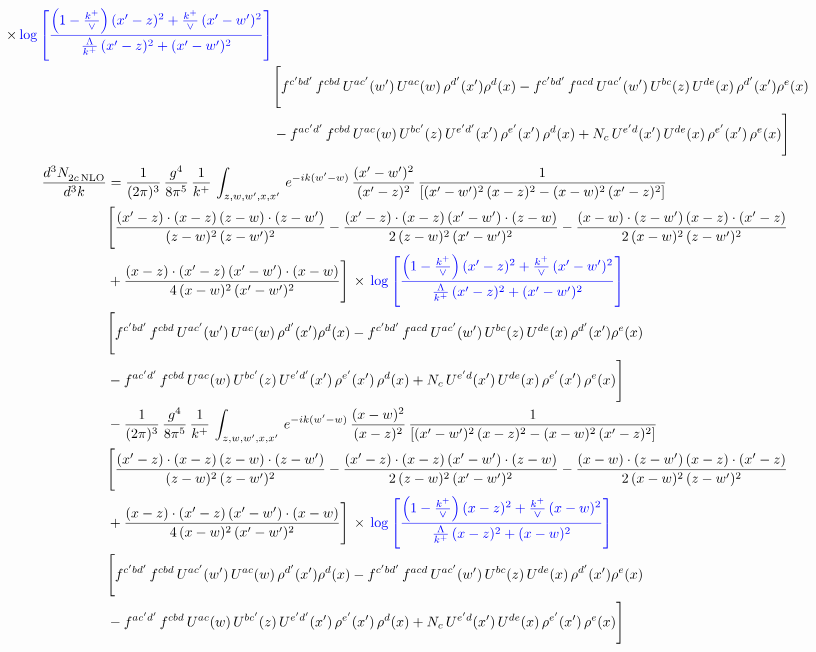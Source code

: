 \documentclass[9pt]{article}
\newcommand{\new}[1]{{\color{blue}#1}}
\numberwithin{equation}{section}
\begin{document}
\begin{align}
\times\,\new{\log{\left[\frac{\left(1-\frac{k^{+}}{\vee}\right)(x'-z)^{2}+\frac{k^{+}}{\vee}\,(x'-w')^{2}}{\frac{\Lambda}{k^{+}}\,(x'-z)^{2}+(x'-w')^{2}}\right]}} \notag \\ & \Bigg[f^{c'bd'}\,f^{cbd}\, U^{ac'}(w')\,U^{ac}(w)\,\rho^{d'}(x')\rho^{d}(x)- f^{c'bd'}\,f^{acd}\,U^{ac'}(w')\,U^{bc}(z)\,U^{de}(x)\,\rho^{d'}(x')\rho^{e}(x) \notag \\ & -f^{ac'd'}\,f^{cbd}\,U^{ac}(w)\,U^{bc'}(z)\,U^{e'd'}(x')\,\rho^{e'}(x')\,\rho^{d}(x) +N_{c}\,U^{e'd}(x')\,U^{de}(x)\,\rho^{e'}(x')\,\rho^{e}(x)\Bigg]
\end{align}
\begin{align}
    \frac{d^{3}N_{2c\,\rm NLO}^{\rm}}{d^{3}k}  & = \frac{1}{(2\pi)^{3}}\, \frac{g^{4}}{8\pi^{5}}\,\frac{1}{k^{+}}\,\int_{z,w,w^{\prime},x,x'}\, e^{-ik(w^{\prime}-w)}\,\frac{(x'-w')^{2}}{(x'-z)^{2}}\, \frac{1}{\left[(x'-w')^{2}\, (x-z)^{2} - (x-w)^{2}\, (x'-z)^{2}\right]} \notag \\ & \Bigg[\frac{(x'-z)\cdot (x-z)\, (z-w)\cdot (z-w')}{(z-w)^{2}\, (z-w')^{2}}-\frac{(x'-z)\cdot (x-z)\, (x'-w')\cdot (z-w)}{2\, (z-w)^{2}\, (x'-w')^{2}} -\frac{(x-w)\cdot (z-w')\, (x-z)\cdot (x'-z)}{2\, (x-w)^{2}\, (z-w')^{2}}\notag \\ & +\frac{(x-z)\cdot (x'-z)\, (x'-w')\cdot (x-w)}{4\, (x-w)^{2}\, (x'-w')^{2}}\Bigg]\,\times\, \new{\log{\left[\frac{\left(1-\frac{k^{+}}{\vee}\right)(x'-z)^{2}+\frac{k^{+}}{\vee}\,(x'-w')^{2}}{\frac{\Lambda}{k^{+}}\,(x'-z)^{2}+(x'-w')^{2}}\right]}} \notag \\ &  \Bigg[f^{c'bd'}\,f^{cbd}\, U^{ac'}(w')\,U^{ac}(w)\,\rho^{d'}(x')\rho^{d}(x)- f^{c'bd'}\,f^{acd}\,U^{ac'}(w')\,U^{bc}(z)\,U^{de}(x)\,\rho^{d'}(x')\rho^{e}(x) \notag \\ & -f^{ac'd'}\,f^{cbd}\,U^{ac}(w)\,U^{bc'}(z)\,U^{e'd'}(x')\,\rho^{e'}(x')\,\rho^{d}(x) +N_{c}\,U^{e'd}(x')\,U^{de}(x)\,\rho^{e'}(x')\,\rho^{e}(x)\Bigg]\notag \\ & -\frac{1}{(2\pi)^{3}}\, \frac{g^{4}}{8\pi^{5}}\,\frac{1}{k^{+}}\,\int_{z,w,w^{\prime},x,x'}\, e^{-ik(w^{\prime}-w)}\,\frac{(x-w)^{2}}{(x-z)^{2}}\, \frac{1}{\left[(x'-w')^{2}\, (x-z)^{2} - (x-w)^{2}\, (x'-z)^{2}\right]} \notag \\ & \Bigg[\frac{(x'-z)\cdot (x-z)\, (z-w)\cdot (z-w')}{(z-w)^{2}\, (z-w')^{2}}-\frac{(x'-z)\cdot (x-z)\, (x'-w')\cdot (z-w)}{2\, (z-w)^{2}\, (x'-w')^{2}} -\frac{(x-w)\cdot (z-w')\, (x-z)\cdot (x'-z)}{2\, (x-w)^{2}\, (z-w')^{2}}\notag \\ & +\frac{(x-z)\cdot (x'-z)\, (x'-w')\cdot (x-w)}{4\, (x-w)^{2}\, (x'-w')^{2}}\Bigg]\,\times\, \new{\log{\left[\frac{\left(1-\frac{k^{+}}{\vee}\right)(x-z)^{2}+\frac{k^{+}}{\vee}\,(x-w)^{2}}{\frac{\Lambda}{k^{+}}\,(x-z)^{2}+(x-w)^{2}}\right]}} \notag \\ &  \Bigg[f^{c'bd'}\,f^{cbd}\, U^{ac'}(w')\,U^{ac}(w)\,\rho^{d'}(x')\rho^{d}(x)- f^{c'bd'}\,f^{acd}\,U^{ac'}(w')\,U^{bc}(z)\,U^{de}(x)\,\rho^{d'}(x')\rho^{e}(x) \notag \\ & -f^{ac'd'}\,f^{cbd}\,U^{ac}(w)\,U^{bc'}(z)\,U^{e'd'}(x')\,\rho^{e'}(x')\,\rho^{d}(x) +N_{c}\,U^{e'd}(x')\,U^{de}(x)\,\rho^{e'}(x')\,\rho^{e}(x)\Bigg]
\end{align}
\end{document}
